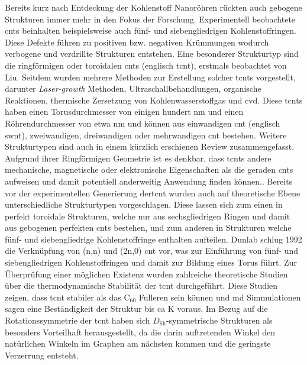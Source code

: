 Bereits kurz nach Entdeckung der Kohlenstoff Nanoröhren rückten auch gebogene Strukturen immer mehr in den Fokus der Forschung. Experimentell beobachtete \acp{cnt} beinhalten  beispielsweise auch fünf- und siebengliedrigen Kohlenstoffringen.\supercite{ichihashi1992pentagons} Diese Defekte führen zu positiven bzw. negativen Krümmungen wodurch verbogene und verdrillte Strukturen entstehen. Eine besonderer Strukturtyp sind die ringförmigen oder toroidalen \acp{cnt} (englisch \ac{tcnt}), erstmals beobachtet von Liu.\supercite{liu1997c} Seitdem wurden mehrere Methoden zur Erstellung solcher \acp{tcnt} vorgestellt, darunter \textit{Laser-growth} Methoden,\supercite{liu1997c} Ultraschallbehandlungen,\supercite{martel1999rings,martel1999ring} organische Reaktionen,\supercite{sano2001ring,geng2008synthesis} thermische Zersetzung von Kohlenwasserstoffgas\supercite{ahlskog1999ring} und \ac{cvd}\supercite{song2006large,zhou2006ring}. Diese \acp{tcnt} haben einen Torusdurchmesser von einigen hundert nm und einen Röhrendurchmesser von etwa \unit[5-20]{nm} und können aus einwandigen \ac{cnt} (englisch \ac{swnt}),\supercite{martel1999rings,martel1999ring,sano2001ring,geng2008synthesis,komatsu2006ultrasonic,guo2007spontaneously} zweiwandigen,\supercite{colomer2003rings} dreiwandigen\supercite{yu2006rings} oder mehrwandigen\supercite{ahlskog1999ring} \ac{cnt} bestehen. Weitere Strukturtypen sind auch in einem kürzlich erschienen Review\supercite{liu2014curved} zusammengefasst.
Aufgrund ihrer Ringförmigen Geometrie ist es denkbar, dass \acp{tcnt} andere mechanische, magnetische oder elektronische Eigenschaften als die geraden \acp{cnt} aufweisen und damit potentiell anderweitig Anwendung finden können.\supercite{liu2014curved}.
Bereits vor der experimentellen Generierung der\ac{tcnt} wurden auch auf theoretische Ebene unterschiedliche Strukturtypen vorgeschlagen. Diese lassen sich zum einen in perfekt toroidale Strukturen, welche nur aus sechsgliedrigen Ringen und damit aus gebogenen perfekten \acp{cnt} bestehen, und zum anderen in Strukturen welche fünf- und siebengliedrige Kohlenstoffringe enthalten aufteilen. Dunlab\supercite{dunlap1992connecting} schlug 1992 die Verknüpfung von (n,n) und (2n,0) \ac{cnt} vor, was zur Einführung von fünf- und siebengliedrigen Kohlenstoffringen und damit zur Bildung eines Torus führt. Zur Überprüfung einer möglichen Existenz wurden zahlreiche theoretische Studien über die thermodynamische Stabilität der \ac{tcnt} durchgeführt. Diese Studien zeigen, dass \ac{tcnt} stabiler als das C$_{60}$ Fulleren\supercite{dunlap1992connecting,itoh1993toroidal,ihara1993toroidal,itoh1993toroidal2} sein können und \ac{md} Simmulationen\supercite{itoh1993toroidal,hod2003carbon,tacsci2005stability,chen2011thermal} sagen eine Beständigkeit der Struktur bis ca \unit[2000]{K} voraus. Im Bezug auf die Rotationssymmetrie der \ac{tcnt} haben sich $D_{\text{6h}}$-symmetrische Strukturen als besonders Vorteilhaft herausgestellt\supercite{liu2011structure,ihara1995helically}, da die darin auftretenden Winkel den natürlichen Winkeln im Graphen am nächsten kommen und die geringste Verzerrung entsteht. 

